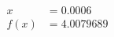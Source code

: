 \documentclass[preview]{standalone}
\begin{document}
\begin{align*}
x &= 0.0006\\f(x) &= 4.0079689
\end{align*}
\end{document}
